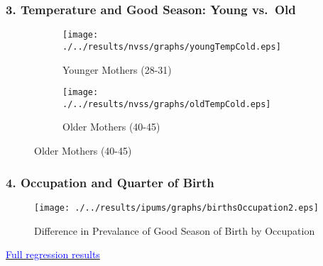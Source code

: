 \documentclass[10pt,letterpaper,subeqn]{beamer}
\begin{document}
%





\begin{frame}[label=weather]
\frametitle{3. Temperature and Good Season: Young vs.\ Old}
\begin{figure}[htpb!]
\begin{center}
\caption{Prevalence of Good Season of Birth and Cold Temperatures}
\label{fig:tempUSA}
\begin{subfigure}{.5\textwidth}
  \centering
  \texttt{[image: ./../results/nvss/graphs/youngTempCold.eps]}
  \caption{Younger Mothers (28-31)}
  \label{fig:tempUSAYoung}
\end{subfigure}%
\begin{subfigure}{.5\textwidth}
  \centering
  \texttt{[image: ./../results/nvss/graphs/oldTempCold.eps]}
  \caption{Older Mothers (40-45)}
  \label{fig:tempUSAOld}
\end{subfigure}
\end{center}
\end{figure}

\vspace{8mm}
\end{frame}




\begin{frame}[label=occGraph]
\frametitle{4. Occupation and Quarter of Birth}
\begin{figure}[htpb!]
\begin{center}
  \centering
  \caption{Difference in Prevalance of Good Season of Birth by Occupation}
  \texttt{[image: ./../results/ipums/graphs/birthsOccupation2.eps]}
  \label{fig:goodByOcc2}
\end{center}

\end{figure}
\hyperlink{occReg}{\footnotesize \textcolor{blue}{Full regression results}}
\end{frame}
\end{document}
